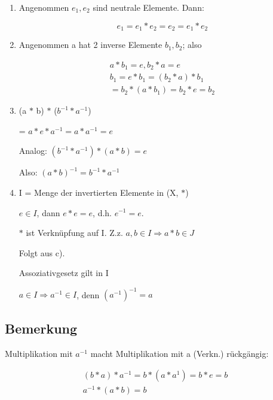 \documentclass[a4paper, openany]{book}
\begin{document}
\begin{enumerate}[label=(\alph*)]
  \item Angenommen $e_1, e_2$ sind neutrale Elemente. Dann:

  \begin{equation}
    e_1 = e_1 \ast e_2 = e_2 = e_1 \ast e_2
  \end{equation}

  \item Angenommen a hat 2 inverse Elemente $b_1, b_2$; also 

  \begin{equation}
    \begin{split}
      a \ast b_1 = e, b_2 \ast a = e \\
      b_1 = e \ast b_1 = (b_2 \ast a) \ast b_1 \\
      = b_2 \ast (a \ast b_1) = b_2 \ast e = b_2
    \end{split}
  \end{equation}

  \item (a $\ast$ b) $\ast$ ($b^{-1} \ast a^{-1}$) 

  = $a \ast e \ast a^{-1} = a \ast a^{-1} = e$

  Analog: $(b^{-1} \ast a^{-1}) \ast (a \ast b) = e$

  Also: $(a \ast b)^{-1} = b^{-1} \ast a^{-1}$

  \item I = Menge der invertierten Elemente in (X, $\ast$)

  $e \in I$, dann $e \ast e = e$, d.h. $e^{-1} = e$.

  $\ast$ ist Verknüpfung auf I. Z.z. $a,b \in I \Rightarrow a \ast b \in J$

  Folgt aus c). 

  Assoziativgesetz gilt in I

  $a \in I \Rightarrow a^{-1} \in I$, denn $(a^{-1})^{-1} = a$
  \end{enumerate}

  \subsection{Bemerkung}

  Multiplikation mit $a^{-1}$ macht Multiplikation mit a (Verkn.) rückgängig: 

  \begin{equation}
    \begin{split}
      (b \ast a) \ast a^{-1} = b \ast (a \ast a^{1}) = b \ast e = b \\
      a^{-1} \ast (a \ast b) = b
    \end{split}
  \end{equation}
\end{document}
